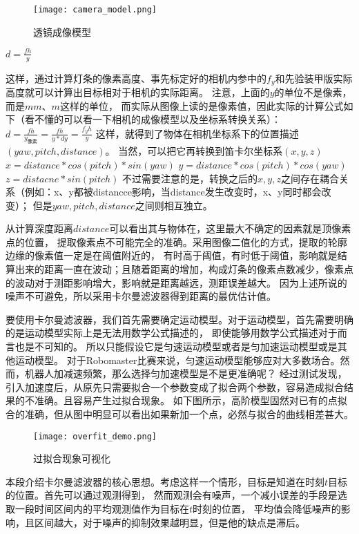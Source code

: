 \begin{figure}[H]
    \centering
    \texttt{[image: camera\_model.png]} 
    \caption{透镜成像模型} 
\end{figure}    

$d = \frac{fh}{y}$

这样，通过计算灯条的像素高度、事先标定好的相机内参中的$f_y$和先验装甲版实际高度就可以计算出目标相对于相机的实际距离。
注意，上面的$y$的单位不是像素，而是$mm$、$m$这样的单位，
而实际从图像上读的是像素值，因此实际的计算公式如下（看不懂的可以看一下相机的成像模型以及坐标系转换关系）：
$d=\frac{fh}{y_{像素}}=\frac{fh}{y*dy}=\frac{f_yh}{y}$
这样，就得到了物体在相机坐标系下的位置描述$(yaw,pitch, distance)$。
当然，可以把它再转换到笛卡尔坐标系$(x,y,z)$
$x = distance*cos(pitch)*sin(yaw)$
$y = distance*cos(pitch)*cos(yaw)$
$z = distacne * sin(pitch)$
不过需要注意的是，转换之后的$x,y,z$之间存在耦合关系（例如：x、y都被distancce影响，当distance发生改变时，x、y同时都会改变）；
但是$yaw,pitch,distance$之间则相互独立。\par

从计算深度距离$distance$可以看出其与物体在，这里最大不确定的因素就是顶像素点的位置，
提取像素点不可能完全的准确。采用图像二值化的方式，提取的轮廓边缘的像素值一定是在阈值附近的，
有时高于阈值，有时低于阈值，影响就是结算出来的距离一直在波动；且随着距离的增加，构成灯条的像素点数减少，像素点的波动对于测距影响增大，影响就是距离越远，测距误差越大。
因为上述所说的噪声不可避免，所以采用卡尔曼滤波器得到距离的最优估计值。\par


要使用卡尔曼滤波器，我们首先需要确定运动模型。对于运动模型，首先需要明确的是运动模型实际上是无法用数学公式描述的，
即使能够用数学公式描述对于而言也是不可知的。 所以只能假设它是匀速运动模型或者是匀加速运动模型或是其他运动模型。
对于Robomaster比赛来说，匀速运动模型能够应对大多数场合。然而，机器人加减速频繁，那么选择匀加速模型是不是更准确呢？ 
经过测试发现，引入加速度后，从原先只需要拟合一个参数变成了拟合两个参数，容易造成拟合结果的不准确。且容易产生过拟合现象。
如下图所示，高阶模型固然对已有的点拟合的准确，但从图中明显可以看出如果新加一个点，必然与拟合的曲线相差甚大。
\begin{figure}[H]
    \centering
    \texttt{[image: overfit\_demo.png]} 
    \caption{过拟合现象可视化} 
\end{figure} 

本段介绍卡尔曼滤波器的核心思想。考虑这样一个情形，目标是知道在时刻$t$目标的位置。首先可以通过观测得到，
然而观测会有噪声，一个减小误差的手段是选取一段时间区间内的平均观测值作为目标在$t$时刻的位置，
平均值会降低噪声的影响，且区间越大，对于噪声的抑制效果越明显，但是他的缺点是滞后。\par

